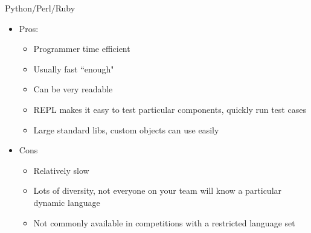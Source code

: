 \documentclass{beamer}
\begin{document}
\begin{frame}{Python/Perl/Ruby}
  \begin{centering}
    \begin{itemize}
      \item Pros:
      \begin{itemize}
        \item Programmer time efficient
        \item Usually fast ``enough"
        \item Can be very readable
        \item REPL makes it easy to test particular components, quickly run test cases
        \item Large standard libs, custom objects can use easily
      \end{itemize}
      \item Cons
      \begin{itemize}
        \item Relatively slow
        \item Lots of diversity, not everyone on your team will know a particular dynamic language
        \item Not commonly available in competitions with a restricted language set
      \end{itemize}
    \end{itemize}
  \end{centering}
\end{frame}
\end{document}

